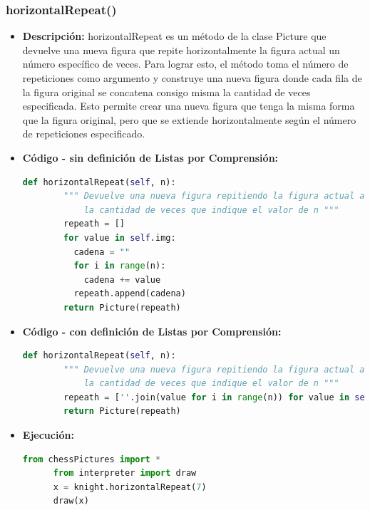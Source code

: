 \documentclass{article}
\begin{document}
  \subsubsection{horizontalRepeat()}
  \begin{itemize}
    \item \textbf{Descripción: }horizontalRepeat es un método de la clase Picture que devuelve una nueva figura 
      que repite horizontalmente la figura actual un número específico de veces. Para lograr esto, el método toma el número 
      de repeticiones como argumento y construye una nueva figura donde cada fila de la figura original se concatena consigo misma 
      la cantidad de veces especificada. Esto permite crear una nueva figura que tenga la misma forma que la figura original, pero 
      que se extiende horizontalmente según el número de repeticiones especificado.
    \item \textbf{Código - sin definición de Listas por Comprensión:}
    \begin{lstlisting}[language=Python, caption=Método horizontalRepeat()]
      def horizontalRepeat(self, n):
        """ Devuelve una nueva figura repitiendo la figura actual al costado
            la cantidad de veces que indique el valor de n """
        repeath = []
        for value in self.img:
          cadena = ""
          for i in range(n):
            cadena += value
          repeath.append(cadena)
        return Picture(repeath)
    \end{lstlisting}
    \newpage
    \item \textbf{Código - con definición de Listas por Comprensión:}
    \begin{lstlisting}[language=Python, caption=Método horizontalRepeat()]
      def horizontalRepeat(self, n):
        """ Devuelve una nueva figura repitiendo la figura actual al costado
            la cantidad de veces que indique el valor de n """
        repeath = [''.join(value for i in range(n)) for value in self.img]
        return Picture(repeath)
    \end{lstlisting}
    \item \textbf{Ejecución:}
    \begin{lstlisting}[language=Python, caption=Prueba horizontalRepeat()]
      from chessPictures import *
      from interpreter import draw
      x = knight.horizontalRepeat(7)
      draw(x)
    \end{lstlisting}
    \begin{figure}[H]
      \centering

\end{figure}
\end{itemize}
\end{document}
